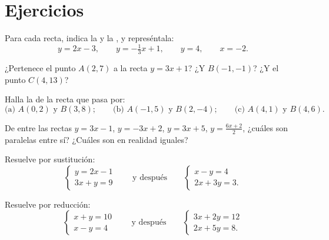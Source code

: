 \section{Ejercicios}

\begin{exercise}[$\star$]\label{exo:g10:lines:1}
Para cada recta, indica la  y la , y
represéntala:
\[
y = 2x - 3, \qquad
y = -\tfrac13 x + 1, \qquad
y = 4, \qquad
x = -2 .
\]
\end{exercise}

\begin{exercise}[$\star$]\label{exo:g10:lines:2}
¿Pertenece el punto $A(2, 7)$ a la recta $y = 3x + 1$? ¿Y $B(-1, -1)$? ¿Y
el punto $C(4, 13)$?
\end{exercise}

\begin{exercise}[$\star$]\label{exo:g10:lines:3}
Halla la  de la recta que pasa por:
\[
\text{(a) } A(0, 2) \text{ y } B(3, 8);
\qquad
\text{(b) } A(-1, 5) \text{ y } B(2, -4);
\qquad
\text{(c) } A(4, 1) \text{ y } B(4, 6).
\]
\end{exercise}

\begin{exercise}[$\star$]\label{exo:g10:lines:4}
De entre las rectas $y = 3x - 1$, $y = -3x + 2$, $y = 3x + 5$,
$y = \frac{6x + 2}{2}$, ¿cuáles son paralelas entre sí? ¿Cuáles son en
realidad iguales?
\end{exercise}

\begin{exercise}[$\star$]\label{exo:g10:lines:5}
Resuelve por sustitución:
\[
\begin{cases}
y = 2x - 1 \\
3x + y = 9
\end{cases}
\qquad\text{y después}\qquad
\begin{cases}
x - y = 4 \\
2x + 3y = 3 .
\end{cases}
\]
\end{exercise}

\begin{exercise}[$\star$]\label{exo:g10:lines:6}
Resuelve por reducción:
\[
\begin{cases}
x + y = 10 \\
x - y = 4
\end{cases}
\qquad\text{y después}\qquad
\begin{cases}
3x + 2y = 12 \\
2x + 5y = 8 .
\end{cases}
\]
\end{exercise}

